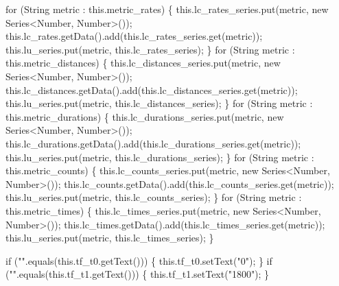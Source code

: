 \nwenddocs{}\endmoddef{}
for (String metric : this.metric_rates) \{
  this.lc_rates_series.put(metric, new Series<Number, Number>());
  this.lc_rates.getData().add(this.lc_rates_series.get(metric));
  this.lu_series.put(metric, this.lc_rates_series);
\}
for (String metric : this.metric_distances) \{
  this.lc_distances_series.put(metric, new Series<Number, Number>());
  this.lc_distances.getData().add(this.lc_distances_series.get(metric));
  this.lu_series.put(metric, this.lc_distances_series);
\}
for (String metric : this.metric_durations) \{
  this.lc_durations_series.put(metric, new Series<Number, Number>());
  this.lc_durations.getData().add(this.lc_durations_series.get(metric));
  this.lu_series.put(metric, this.lc_durations_series);
\}
for (String metric : this.metric_counts) \{
  this.lc_counts_series.put(metric, new Series<Number, Number>());
  this.lc_counts.getData().add(this.lc_counts_series.get(metric));
  this.lu_series.put(metric, this.lc_counts_series);
\}
for (String metric : this.metric_times) \{
  this.lc_times_series.put(metric, new Series<Number, Number>());
  this.lc_times.getData().add(this.lc_times_series.get(metric));
  this.lu_series.put(metric, this.lc_times_series);
\}
\nwendcode{}\nwdocspar

\nwenddocs{}\endmoddef{}
if ("".equals(this.tf_t0.getText())) \{
  this.tf_t0.setText("0");
\}
if ("".equals(this.tf_t1.getText())) \{
  this.tf_t1.setText("1800");
\}
\nwendcode{}\nwdocspar

